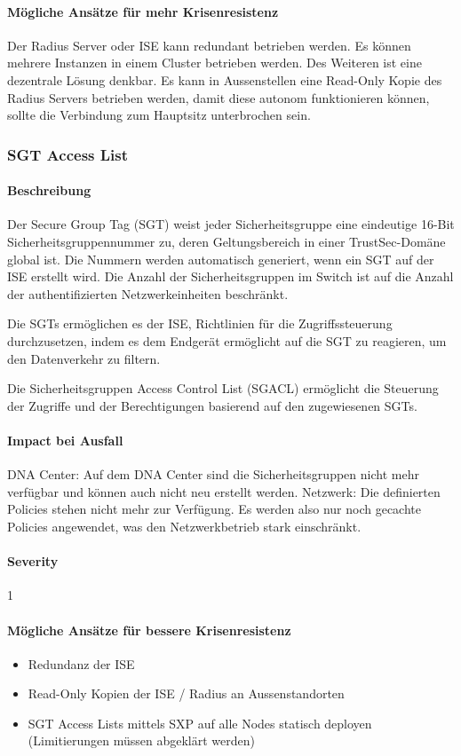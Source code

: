 \paragraph{Mögliche Ansätze für mehr Krisenresistenz}

Der Radius Server oder ISE kann redundant betrieben werden. Es können mehrere Instanzen in einem Cluster betrieben werden. Des Weiteren ist eine dezentrale Lösung denkbar. Es kann in Aussenstellen eine Read-Only Kopie des Radius Servers betrieben werden, damit diese autonom funktionieren können, sollte die Verbindung zum Hauptsitz unterbrochen sein.

\subsubsection{SGT Access List}
\paragraph{Beschreibung}
Der Secure Group Tag (SGT) weist jeder Sicherheitsgruppe eine eindeutige 16-Bit Sicherheitsgruppennummer zu, deren Geltungsbereich in einer TrustSec-Domäne global ist. Die Nummern werden automatisch generiert, wenn ein SGT auf der ISE erstellt wird. Die Anzahl der Sicherheitsgruppen im Switch ist auf die Anzahl der authentifizierten Netzwerkeinheiten beschränkt.

Die SGTs ermöglichen es der ISE, Richtlinien für die Zugriffssteuerung durchzusetzen, indem es dem Endgerät ermöglicht auf die SGT zu reagieren, um den Datenverkehr zu filtern.

Die Sicherheitsgruppen Access Control List (SGACL) ermöglicht die Steuerung der Zugriffe und der Berechtigungen basierend auf den zugewiesenen SGTs.

\paragraph{Impact bei Ausfall}
DNA Center: Auf dem DNA Center sind die Sicherheitsgruppen nicht mehr verfügbar und können auch nicht neu erstellt werden.
Netzwerk: Die definierten Policies stehen nicht mehr zur Verfügung. Es werden also nur noch gecachte Policies angewendet, was den Netzwerkbetrieb stark einschränkt. 

\paragraph{Severity} 1

\paragraph{Mögliche Ansätze für bessere Krisenresistenz}
\begin{itemize}
	\item Redundanz der ISE
	\item Read-Only Kopien der ISE / Radius an Aussenstandorten
	\item SGT Access Lists mittels SXP auf alle Nodes statisch deployen (Limitierungen müssen abgeklärt werden)
\end{itemize}

